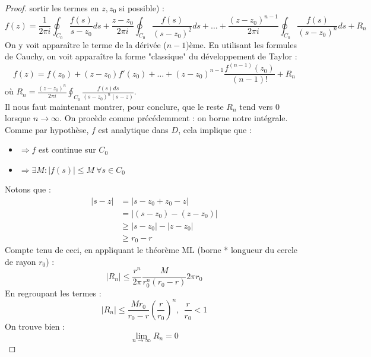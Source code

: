 \begin{proof}
	sortir les termes en $z, z_0$ si possible) :
	\begin{equation}
		f(z) = \frac{1}{2\pi i}\oint_{C_0}\frac{f(s)}{s-z_0}ds + \frac{z-z_0}{2\pi i}\oint_{C_0}
		\frac{f(s)}{(s-z_0)^2}ds + \dots + \frac{(z-z_0)^{n-1}}{2\pi i}\oint_{C_0}\frac{f(s)}{(s
		-z_0)^n}ds + R_n
	\end{equation}
	On y voit apparaître le terme de la dérivée ($n-1$)ème. En utilisant les formules de 
	Cauchy, on voit apparaître la forme "classique" du développement de Taylor :
	\begin{equation}
		f(z) = f(z_0) + (z-z_0)f'(z_0) + \dots + (z-z_0)^{n-1}\frac{f^{(n-1)}(z_0)}{(n-1)!}+R_n
	\end{equation}
	où $R_n = \frac{(z-z_0)^n}{2\pi i}\oint_{C_0}\frac{f(s)ds}{(s-z_0)^n(s-z)}$.\\
		
	Il nous faut maintenant montrer, pour conclure, que le reste $R_n$ tend vers 0 lorsque $n
	\rightarrow \infty$. On procède comme précédemment : on borne notre intégrale. Comme par
	hypothèse, $f$ est analytique dans $D$, cela implique que :
	\begin{itemize}
		\item $\Rightarrow f$ est continue sur $C_0$
		\item $\Rightarrow \exists M : |f(s)| \leq M\ \forall s \in C_0$
	\end{itemize}
	Notons que :
	\begin{equation}
		\begin{array}{ll}
			|s-z| & = |s-z_0+z_0-z|      \\
			      & = |(s-z_0)-(z-z_0)|  \\
			      & \geq |s-z_0|-|z-z_0| \\
			      & \geq r_0-r           
		\end{array}
	\end{equation}
	Compte tenu de ceci, en appliquant le théorème ML (borne * longueur du cercle
	de rayon $r_0$) :
	\begin{equation}
		|R_n| \leq \frac{r^n}{2\pi}\frac{M}{r^n_0(r_0-r)}2\pi r_0
	\end{equation}
	En regroupant les termes :
	\begin{equation}
		|R_n| \leq \frac{Mr_0}{r_0-r}\left(\dfrac{r}{r_0}\right)^n, \ \ \frac{r}{r_0}<1
	\end{equation}
	On trouve bien :
	\begin{equation}
		\lim\limits_{n\rightarrow\infty} R_n = 0
	\end{equation}
\end{proof}
	
